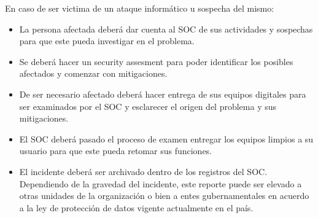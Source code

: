 \documentclass[11pt]{utalcaDoc}
\begin{document}
En caso de ser victima de un ataque informático u sospecha del mismo:
\begin{itemize}
    \item La persona afectada deberá dar cuenta al SOC de sus actividades y sospechas para que este pueda investigar en el problema.
    \item Se deberá hacer un security assesment para poder identificar los posibles afectados y comenzar con mitigaciones.
    \item De ser necesario afectado deberá hacer entrega de sus equipos digitales para ser examinados por el SOC y esclarecer el origen del problema y sus mitigaciones.
    \item El SOC deberá pasado el proceso de examen entregar los equipos limpios a su usuario para que este pueda retomar sus funciones.
    \item El incidente deberá ser archivado dentro de los registros del SOC. Dependiendo de la gravedad del incidente, este reporte puede ser elevado a otras unidades de la organización o bien a entes gubernamentales en acuerdo a la ley de protección de datos vigente actualmente en el país.
\end{itemize}
\end{document}
